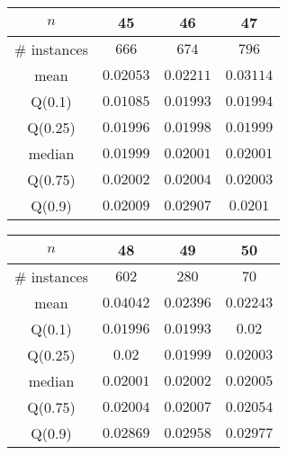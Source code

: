 \begin{tabular}{c|ccc} 
\hline 
$n$ & 45 & 46 & 47 \tabularnewline 
\hline 
\hline 
\# instances & $666$ & $674$ & $796$ \tabularnewline 
mean & $0.02053$ & $0.02211$ & $0.03114$ \tabularnewline 
Q(0.1) & $0.01085$ & $0.01993$ & $0.01994$ \tabularnewline 
Q(0.25) & $0.01996$ & $0.01998$ & $0.01999$ \tabularnewline 
median & $0.01999$ & $0.02001$ & $0.02001$ \tabularnewline 
Q(0.75) & $0.02002$ & $0.02004$ & $0.02003$ \tabularnewline 
Q(0.9) & $0.02009$ & $0.02907$ & $0.0201$ \tabularnewline 
\hline 
\end{tabular} 
\medskip{} 

\begin{tabular}{c|ccc} 
\hline 
$n$ & 48 & 49 & 50 \tabularnewline 
\hline 
\hline 
\# instances & $602$ & $280$ & $70$ \tabularnewline 
mean & $0.04042$ & $0.02396$ & $0.02243$ \tabularnewline 
Q(0.1) & $0.01996$ & $0.01993$ & $0.02$ \tabularnewline 
Q(0.25) & $0.02$ & $0.01999$ & $0.02003$ \tabularnewline 
median & $0.02001$ & $0.02002$ & $0.02005$ \tabularnewline 
Q(0.75) & $0.02004$ & $0.02007$ & $0.02054$ \tabularnewline 
Q(0.9) & $0.02869$ & $0.02958$ & $0.02977$ \tabularnewline 
\hline 
\end{tabular} 
\medskip{} 

